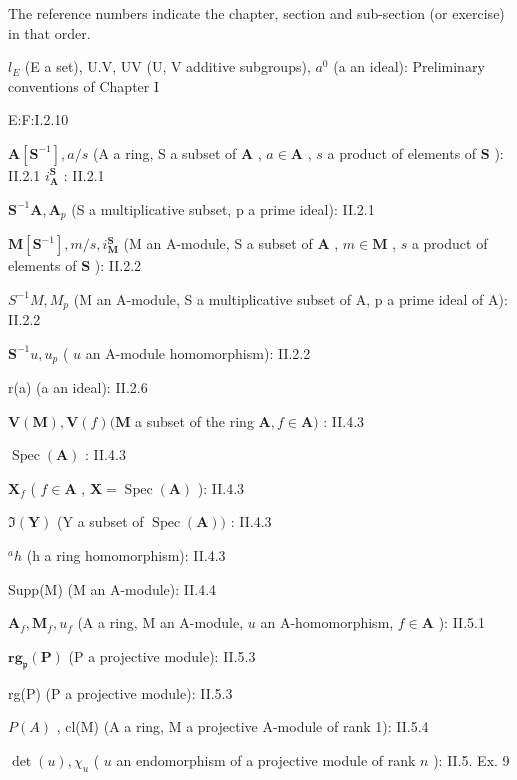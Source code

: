 
The reference numbers indicate the chapter, section and sub-section (or exercise) in that order.

\(l_{E}\) (E a set), U.V, UV (U, V additive subgroups), \(a^{0}\) (a an ideal): Preliminary conventions of Chapter I

E:F:I.2.10

\(\mathbf{A}[\mathbf{S}^{-1}], a / s\) (A a ring, S a subset of \(\mathbf{A}\) , \(a \in \mathbf{A}\) , \(s\) a product of elements of \(\mathbf{S}\) ): II.2.1 \(i_{\mathbf{A}}^{\mathbf{S}}\) : II.2.1

\(\mathbf{S}^{-1}\mathbf{A},\mathbf{A}_{p}\) (S a multiplicative subset, p a prime ideal): II.2.1

\(\mathbf{M}[\mathbf{S}^{-1}], m / s, i_{\mathbf{M}}^{\mathbf{S}}\) (M an A-module, S a subset of \(\mathbf{A}\) , \(m \in \mathbf{M}\) , \(s\) a product of elements of \(\mathbf{S}\) ): II.2.2

\(S^{-1}M, M_{p}\) (M an A-module, S a multiplicative subset of A, p a prime ideal of A): II.2.2

\(\mathbf{S}^{-1}u, u_{p}\) ( \(u\) an A-module homomorphism): II.2.2

r(a) (a an ideal): II.2.6

\(\mathbf{V}(\mathbf{M}), \mathbf{V}(f) (\mathbf{M}\) a subset of the ring \(\mathbf{A}, f \in \mathbf{A})\) : II.4.3

\(\operatorname {Spec}(\mathbf{A})\) : II.4.3

\(\mathbf{X}_f\) ( \(f \in \mathbf{A}\) , \(\mathbf{X} = \operatorname{Spec}(\mathbf{A})\) ): II.4.3

\(\Im (\mathbf{Y})\) (Y a subset of \(\operatorname {Spec}(\mathbf{A}))\) : II.4.3

\(^{a}h\) (h a ring homomorphism): II.4.3

Supp(M) (M an A-module): II.4.4

\(\mathbf{A}_f, \mathbf{M}_f, u_f\) (A a ring, M an A-module, \(u\) an A-homomorphism, \(f \in \mathbf{A}\) ): II.5.1

\(\mathbf{rg}_{\mathfrak{p}}(\mathbf{P})\) (P a projective module): II.5.3

rg(P) (P a projective module): II.5.3

\(P(A)\) , cl(M) (A a ring, M a projective A-module of rank 1): II.5.4

\(\operatorname{det}(u), \chi_u\) ( \(u\) an endomorphism of a projective module of rank \(n\) ): II.5. Ex. 9

